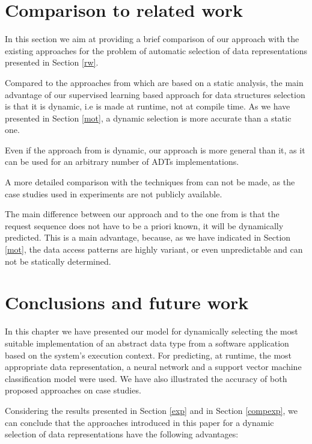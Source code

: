       
\section{Comparison to related work}\label{sec:cmpsvm}


In this section we aim at providing a brief comparison of our approach with the existing approaches for the problem of automatic selection of data representations presented in Section \ref{rw}. 

Compared to the approaches from \cite{29, 30, 31, Low, lowrovner, rovner} which are based on a static analysis, the main advantage of our supervised learning based approach for data structures selection is that it is dynamic, i.e is made at runtime, not at compile time. As we have presented in Section \ref{mot}, a dynamic selection is more accurate than a static one. 

Even if the approach from \cite{Yellin} is dynamic, our approach is more general than it, as it can be used for an arbitrary number of ADTs implementations.    

A more detailed comparison with the techniques from \cite{29, 30, 31, Low, lowrovner, rovner, Yellin} can not be made, as the case studies used in experiments are not publicly available.  

The main difference between our approach and to the one from \cite{chuang} is that the request sequence does not have to be a priori known, it will be dynamically predicted. This is a main advantage, because, as we have indicated in Section \ref{mot}, the data access patterns are highly variant, or even unpredictable and can not be statically determined.  





\section{Conclusions and future work}\label{conc}

In this chapter we have presented our model for dynamically selecting the most suitable implementation of an abstract data type from a software application based on the system's execution context. For predicting, at runtime, the most appropriate data representation, a neural network and a support vector machine classification model were used. We have also illustrated the accuracy of both proposed approaches on case studies.

Considering the results presented in Section \ref{exp} and in Section \ref{compexp}, we can conclude that the approaches introduced in this paper for a dynamic selection of data representations have the following advantages:

